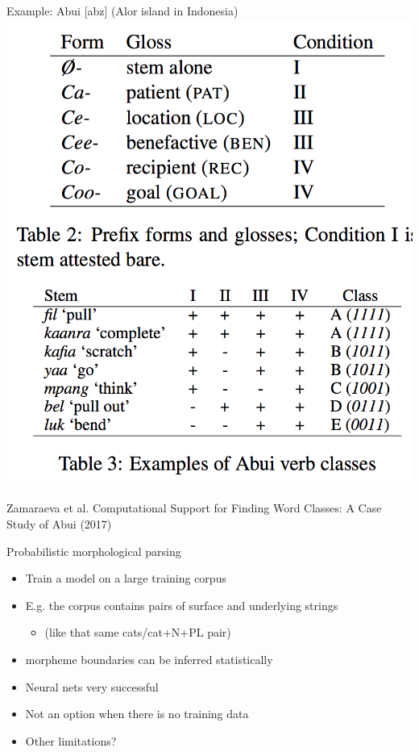 \documentclass{beamer}
\begin{document}
\begin{frame}{Example: Abui [abz] (Alor island in Indonesia)}
  \includegraphics[height=0.8\textheight]{figures/abz}
  
  {\tiny Zamaraeva et al. Computational Support for Finding Word
    Classes: A Case Study of Abui (2017)}
\end{frame}


\begin{frame}{Probabilistic morphological parsing}
  \begin{itemize}
  \item Train a model on a large training corpus
  \item E.g. the corpus contains pairs of surface and underlying strings
    \begin{itemize}
    \item (like that same cats/cat+N+PL pair)
    \end{itemize}
  \item morpheme boundaries can be inferred statistically
  \item Neural nets very successful
  \item Not an option when there is no training data
  \item Other limitations?
  \end{itemize}
\end{frame}
\end{document}
